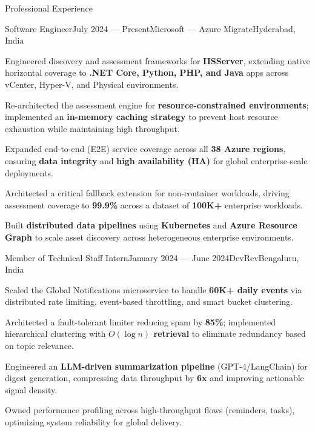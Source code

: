 
\begin{rSection}{Professional Experience}

    \begin{rSubsection}{Software Engineer}{July 2024 --- Present}{Microsoft --- Azure Migrate}{Hyderabad, India}
        \item Engineered discovery and assessment frameworks for \textbf{IISServer}, extending native horizontal coverage to \textbf{.NET Core, Python, PHP, and Java} apps across vCenter, Hyper-V, and Physical environments.
        \item Re-architected the assessment engine for \textbf{resource-constrained environments}; implemented an \textbf{in-memory caching strategy} to prevent host resource exhaustion while maintaining high throughput.
        \item Expanded end-to-end (E2E) service coverage across all \textbf{38 Azure regions}, ensuring \textbf{data integrity} and \textbf{high availability (HA)} for global enterprise-scale deployments.
        \item Architected a critical fallback extension for non-container workloads, driving assessment coverage to \textbf{99.9\%} across a dataset of \textbf{100K+} enterprise workloads.
        \item Built \textbf{distributed data pipelines} using \textbf{Kubernetes} and \textbf{Azure Resource Graph} to scale asset discovery across heterogeneous enterprise environments.
    \end{rSubsection}

    \begin{rSubsection}{Member of Technical Staff Intern}{January 2024 --- June 2024}{DevRev}{Bengaluru, India}
        \item Scaled the Global Notifications microservice to handle \textbf{60K+ daily events} via distributed rate limiting, event-based throttling, and smart bucket clustering.
        \item Architected a fault-tolerant limiter reducing spam by \textbf{85\%}; implemented hierarchical clustering with \textbf{$O(\log n)$ retrieval} to eliminate redundancy based on topic relevance.
        \item Engineered an \textbf{LLM-driven summarization pipeline} (GPT-4/LangChain) for digest generation, compressing data throughput by \textbf{6x} and improving actionable signal density.
        \item Owned performance profiling across high-throughput flows (reminders, tasks), optimizing system reliability for global delivery.
    \end{rSubsection}


\end{rSection}
